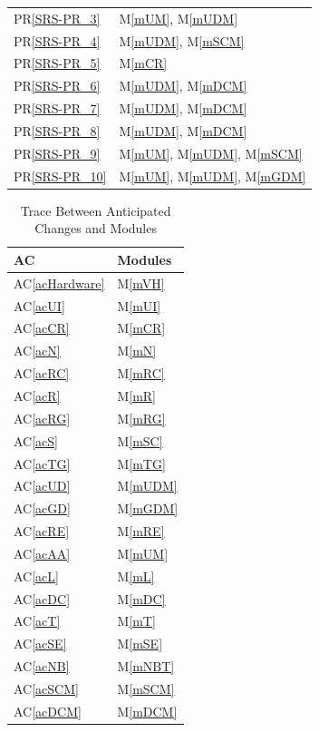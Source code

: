 \documentclass[12pt, titlepage]{article}
\newcommand{\prref}[1]{PR\ref{SRS-#1}}
\newcommand{\acref}[1]{AC\ref{#1}}
\newcommand{\mref}[1]{M\ref{#1}}
\begin{document}
\begin{longtable}{p{} p{}}
\prref{PR_3} & \mref{mUM}, \mref{mUDM}\\
\prref{PR_4} & \mref{mUDM}, \mref{mSCM}\\
\prref{PR_5} & \mref{mCR}\\
\prref{PR_6} & \mref{mUDM}, \mref{mDCM}\\
\prref{PR_7} & \mref{mUDM}, \mref{mDCM}\\
\prref{PR_8} & \mref{mUDM}, \mref{mDCM}\\
\prref{PR_9} & \mref{mUM}, \mref{mUDM}, \mref{mSCM}\\
\prref{PR_10} & \mref{mUM}, \mref{mUDM}, \mref{mGDM}\\
\end{longtable}

\begin{table}[H]
\centering
\begin{tabular}{p{} p{}}
\toprule
\textbf{AC} & \textbf{Modules}\\
\midrule
\acref{acHardware} & \mref{mVH}\\
\acref{acUI} & \mref{mUI}\\
\acref{acCR} & \mref{mCR}\\
\acref{acN} & \mref{mN}\\
\acref{acRC} & \mref{mRC}\\
\acref{acR} & \mref{mR}\\
\acref{acRG} & \mref{mRG}\\
\acref{acS} & \mref{mSC}\\
\acref{acTG} & \mref{mTG}\\
\acref{acUD} & \mref{mUDM}\\
\acref{acGD} & \mref{mGDM}\\
\acref{acRE} & \mref{mRE}\\
\acref{acAA} & \mref{mUM}\\
\acref{acL} & \mref{mL}\\
\acref{acDC} & \mref{mDC}\\
\acref{acT} & \mref{mT}\\
\acref{acSE} & \mref{mSE}\\
\acref{acNB} & \mref{mNBT}\\
\acref{acSCM} & \mref{mSCM}\\
\acref{acDCM} & \mref{mDCM}\\
\bottomrule
\end{tabular}
\caption{Trace Between Anticipated Changes and Modules}
\label{TblACT}
\end{table}
\end{document}
